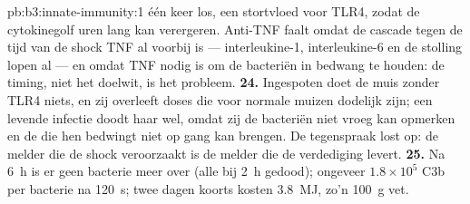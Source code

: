 \begin{solution}{pb:b3:innate-immunity:1}
één keer los, een stortvloed voor TLR4, zodat de cytokinegolf uren lang
kan verergeren. Anti-TNF faalt omdat de cascade tegen de tijd van de
shock TNF al voorbij is --- interleukine-1, interleukine-6 en de
stolling lopen al --- en omdat TNF nodig is om de bacteriën in bedwang
te houden: de timing, niet het doelwit, is het probleem.
\textbf{24.} Ingespoten  doet de muis zonder TLR4
niets, en zij overleeft doses die voor normale muizen dodelijk zijn;
een levende  infectie doodt haar wel, omdat zij de
bacteriën niet vroeg kan opmerken en de  die hen bedwingt
niet op gang kan brengen. De tegenspraak lost op: de melder die de
shock veroorzaakt is de melder die de verdediging levert.
\textbf{25.} Na \qty{6}{h} is er geen bacterie meer over (alle bij
\qty{2}{h} gedood); ongeveer $1.8\times 10^{5}$ C3b per bacterie na
\qty{120}{s}; twee dagen koorts kosten \qty{3.8}{MJ}, zo'n \qty{100}{g}
vet.
\end{solution}
